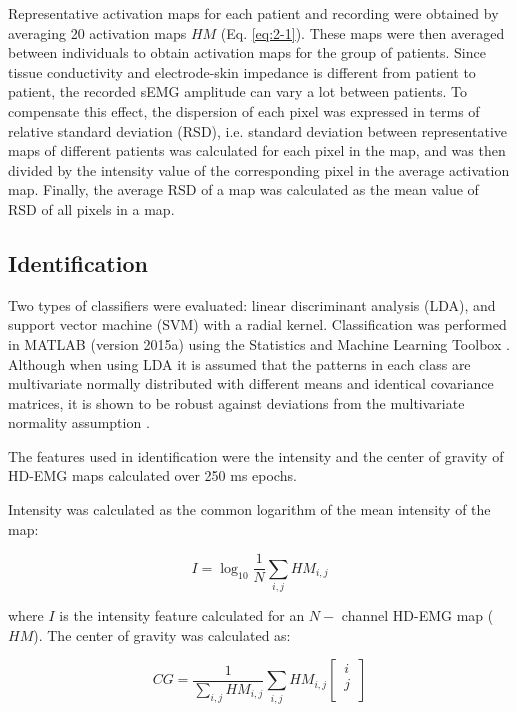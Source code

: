 Representative activation maps for each patient and recording were obtained by averaging 20 activation maps $HM$ (Eq. \ref{eq:2-1}). These maps were then averaged between individuals to obtain activation maps for the group of patients. Since tissue conductivity and electrode-skin impedance is different from patient to patient, the recorded sEMG amplitude can vary a lot between patients. To compensate this effect, the dispersion of each pixel was expressed in terms of relative standard deviation (RSD), i.e. standard deviation between representative maps of different patients was calculated for each pixel in the map, and was then divided by the intensity value of the corresponding pixel in the average activation map. Finally, the average RSD of a map was calculated as the mean value of RSD of all pixels in a map.



\subsection*{Identification}

Two types of classifiers were evaluated: linear discriminant analysis (LDA), and support vector machine (SVM) with a radial kernel. Classification was performed in MATLAB (version 2015a) using the Statistics and Machine Learning Toolbox \citep{matlab}. Although when using LDA it is assumed that the patterns in each class are multivariate normally distributed with different means and identical covariance matrices, it is shown to be robust against deviations from the multivariate normality assumption \citep{Grouven1996}.

The features used in identification were the intensity and the center of gravity of HD-EMG maps calculated over 250 ms epochs.

Intensity was calculated as the common logarithm of the mean intensity of the map:

\begin{equation} \label{eq:2-2}
I = \log_{10} \frac{1}{N} \displaystyle\sum_{i,j} HM_{i,j}
\end{equation}

where $I$ is the intensity feature calculated for an $N-$ channel HD-EMG map ($HM$). The center of gravity was calculated as:

\begin{equation} \label{eq:2-3}
CG = \frac{1}{\sum_{i,j} HM_{i,j}}
\displaystyle\sum_{i,j} HM_{i,j} 
	\begin{bmatrix}
	  \, i \,\\
	  \, j \,\\
	  \end{bmatrix}
\end{equation}


